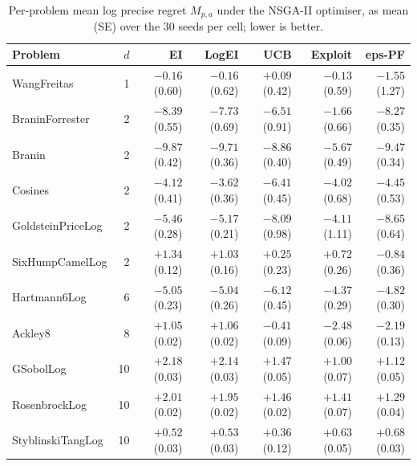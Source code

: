 \begin{table}[t]
\centering
\caption{Per-problem mean log precise regret $M_{p,a}$ under the NSGA-II optimiser, as mean (SE) over the 30 seeds per cell; lower is better.}
\label{tab:appd-mpa-nsga}
\footnotesize
\begin{tabular}{lrrrrrr}
\toprule
Problem & $d$ & EI & LogEI & UCB & Exploit & eps-PF \\
\midrule
WangFreitas & 1 & $-0.16$ (0.60) & $-0.16$ (0.62) & $+0.09$ (0.42) & $-0.13$ (0.59) & $-1.55$ (1.27) \\
BraninForrester & 2 & $-8.39$ (0.55) & $-7.73$ (0.69) & $-6.51$ (0.91) & $-1.66$ (0.66) & $-8.27$ (0.35) \\
Branin & 2 & $-9.87$ (0.42) & $-9.71$ (0.36) & $-8.86$ (0.40) & $-5.67$ (0.49) & $-9.47$ (0.34) \\
Cosines & 2 & $-4.12$ (0.41) & $-3.62$ (0.36) & $-6.41$ (0.45) & $-4.02$ (0.68) & $-4.45$ (0.53) \\
GoldsteinPriceLog & 2 & $-5.46$ (0.28) & $-5.17$ (0.21) & $-8.09$ (0.98) & $-4.11$ (1.11) & $-8.65$ (0.64) \\
SixHumpCamelLog & 2 & $+1.34$ (0.12) & $+1.03$ (0.16) & $+0.25$ (0.23) & $+0.72$ (0.26) & $-0.84$ (0.36) \\
Hartmann6Log & 6 & $-5.05$ (0.23) & $-5.04$ (0.26) & $-6.12$ (0.45) & $-4.37$ (0.29) & $-4.82$ (0.30) \\
Ackley8 & 8 & $+1.05$ (0.02) & $+1.06$ (0.02) & $-0.41$ (0.09) & $-2.48$ (0.06) & $-2.19$ (0.13) \\
GSobolLog & 10 & $+2.18$ (0.03) & $+2.14$ (0.03) & $+1.47$ (0.05) & $+1.00$ (0.07) & $+1.12$ (0.05) \\
RosenbrockLog & 10 & $+2.01$ (0.02) & $+1.95$ (0.02) & $+1.46$ (0.02) & $+1.41$ (0.07) & $+1.29$ (0.04) \\
StyblinskiTangLog & 10 & $+0.52$ (0.03) & $+0.53$ (0.03) & $+0.36$ (0.12) & $+0.63$ (0.05) & $+0.68$ (0.03) \\
\bottomrule
\end{tabular}
\end{table}

